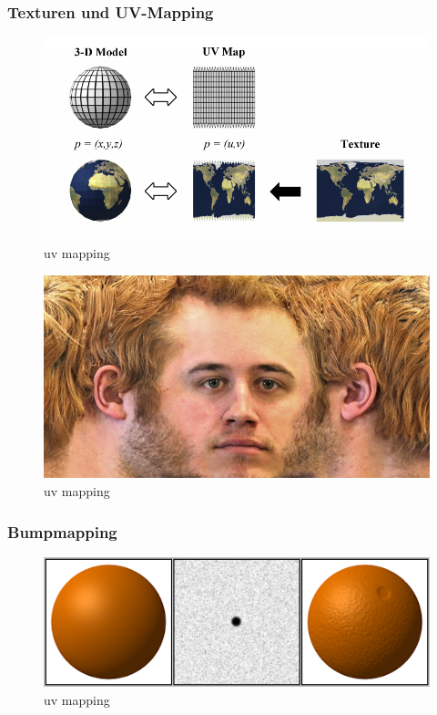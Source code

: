 \subsubsection{Texturen und UV-Mapping}
\begin{figure}[H]
    \centering
    \includegraphics[width=1.0\textwidth]{images/tm_uv.png}
    \caption{uv mapping}
\end{figure}

\begin{figure}[H]
    \centering
    \includegraphics[width=1.0\textwidth]{images/tm_face.jpg}
    \caption{uv mapping}
\end{figure}


\subsubsection{Bumpmapping}
\begin{figure}[H]
    \centering
    \includegraphics[width=1.0\textwidth]{images/Bumpmap.png}
    \caption{uv mapping}
\end{figure}

